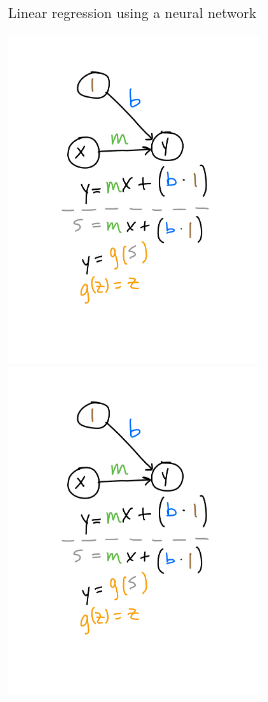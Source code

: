 \documentclass[xetex,compress]{beamer}
\begin{document}
\begin{frame}{Linear regression using a neural network}
  \begin{center}
    \includegraphics[width=0.50\textwidth]{./figures/lr_nn_1.pdf}
    \includegraphics[width=0.50\textwidth]{./figures/lr_nn_2.pdf}
  \end{center}
\end{frame}
\end{document}
